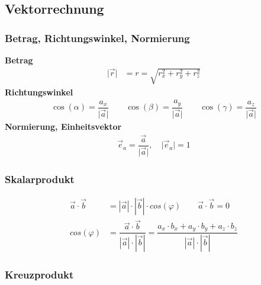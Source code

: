 

\subsection{Vektorrechnung}
\subsubsection{Betrag, Richtungswinkel, Normierung}
\textbf{Betrag}
\begin{align*}
    \vert \vec{r}  \vert & = r = \sqrt{r^2_x + r^2_y + r^2_z}
\end{align*}
\textbf{Richtungswinkel}
\begin{align*}
    \cos(\alpha) = \dfrac{a_x}{\vert \vec{a} \vert} \qquad \cos(\beta) = \dfrac{a_y}{\vert \vec{a} \vert} \qquad
        \cos(\gamma) = \dfrac{a_z}{\vert \vec{a} \vert}
    \end{align*}
    \textbf{Normierung, Einheitsvektor}
    \begin{align*}
        \vec{e}_a =  \dfrac{\vec{a}}{\vert \vec{a} \vert}, \quad \vert \vec{e}_a \vert = 1
    \end{align*}
    
    \subsubsection{Skalarprodukt}
    \begin{align*}
        \vec{a} \cdot \vec{b} & = |\vec{a}| \cdot |\vec{b}| \cdot cos(\varphi) \qquad \vec{a} \cdot \vec{b}  = 0\\
        cos(\varphi)          &  = \dfrac{\vec{a} \cdot \vec{b}}{|\vec{a}| \cdot |\vec{b}|} = \dfrac{a_x \cdot b_x + a_y \cdot b_y + a_z \cdot b_z}{|\vec{a}| \cdot |\vec{b}|}
    \end{align*}

    \subsubsection{Kreuzprodukt}
    
